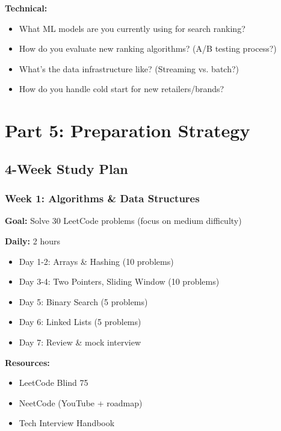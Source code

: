 \documentclass[11pt,letterpaper]{article}
\begin{document}
\textbf{Technical:}
\begin{itemize}
    \item What ML models are you currently using for search ranking?
    \item How do you evaluate new ranking algorithms? (A/B testing process?)
    \item What's the data infrastructure like? (Streaming vs. batch?)
    \item How do you handle cold start for new retailers/brands?
\end{itemize}

\section{Part 5: Preparation Strategy}

\subsection{4-Week Study Plan}

\subsubsection{Week 1: Algorithms \& Data Structures}

\textbf{Goal:} Solve 30 LeetCode problems (focus on medium difficulty)

\textbf{Daily:} 2 hours
\begin{itemize}
    \item Day 1-2: Arrays \& Hashing (10 problems)
    \item Day 3-4: Two Pointers, Sliding Window (10 problems)
    \item Day 5: Binary Search (5 problems)
    \item Day 6: Linked Lists (5 problems)
    \item Day 7: Review \& mock interview
\end{itemize}

\textbf{Resources:}
\begin{itemize}
    \item LeetCode Blind 75
    \item NeetCode (YouTube + roadmap)
    \item Tech Interview Handbook
\end{itemize}
\end{document}
